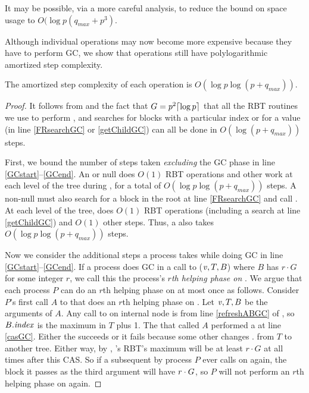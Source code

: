 It may be possible, via a more careful analysis, to reduce the bound on space usage to $O(\log p(q_{max}+p^3)$.

Although individual operations may now become more expensive because they have to perform GC,
we show that operations still have polylogarithmic amortized step complexity.

\begin{mytheorem}
The amortized step complexity of each operation is $O(\log p \log(p+q_{max}))$.
\end{mytheorem}
\begin{proof}
It follows from  and the fact that $G=p^2\lceil \log p \rceil$
that all the RBT routines we use to perform ,  and searches for
blocks with a particular index or for a  value (in line \ref{FRsearchGC} or \ref{getChildGC}) can all be done in $O(\log(p+q_{max}))$ steps.

First, we bound the number of steps taken \emph{excluding} the GC phase in line \ref{GCstart}--\ref{GCend}.
An  or null  does $O(1)$ RBT operations and other work at each level of the tree during ,
for a total of $O(\log p \log(p+q_{max}))$ steps.
A non-null  must also search for a block in the root at line \ref{FRsearchGC}
and call .  At each level of the tree,  does $O(1)$ RBT operations (including a search at line \ref{getChildGC}) and $O(1)$ other steps.
Thus, a  also takes $O(\log p \log(p+q_{max}))$ steps.

Now we consider the additional steps a process takes while doing GC in line \ref{GCstart}--\ref{GCend}.
If a process does GC in a call to ($\mbox{\textnormal{\textit{v}}},T,B$) where $B$ has  $r\cdot G$ for some integer $r$, we call this the process's \emph{$r$th helping phase on }.
We argue that each process $P$ can do an $r$th helping phase on  at most once as follows.
Consider $P$'s first call $A$ to  that does an $r$th helping phase on .
Let $\mbox{\textnormal{\textit{v}}},T,B$ be the arguments of $A$.
Any call to  on internal node  is from line \ref{refreshABGC} of , so $B.\mbox{\textit{index}}$
is the maximum  in $T$ plus 1.
The  that called $A$ performed a  at line \ref{casGC}.  Either the  succeeds
or it fails because 
some other  changes . from $T$ to another tree.
Either way, by , 's RBT's maximum  will be at least $r\cdot G$ at all times
after this CAS.
So if a subsequent  by process $P$ 
ever calls  on  again, the block it passes as the third argument
will have $\index>r\cdot G$, so $P$ will not perform an $r$th helping phase on  again.


\end{proof}
